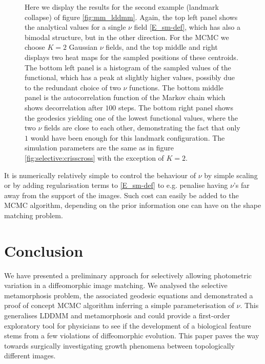 \documentclass[runningheads]{llncs}
\begin{document}
\begin{figure}[h!]
    \caption{ Here we display the results for the second example (landmark
    collapse) of figure \ref{fig:mm_lddmm}.  Again, the top left panel shows the
    analytical values for a single $\nu$ field \eqref{E_sm-def}, which has also
    a bimodal structure, but in the other direction.  For the MCMC we choose
    $K=2$ Gaussian $\nu$ fields, and the top middle and right displays two heat
    maps for the sampled positions of these centroids.  The bottom left panel is
    a histogram of the sampled values of the functional, which has a peak at
    slightly higher values, possibly due to the redundant choice of two $\nu$
    functions.  The bottom middle panel is the autocorrelation function of the
    Markov chain which shows decorrelation after $100$ steps.  The bottom right
    panel shows the geodesics yielding one of the lowest functional values,
    where the two $\nu$  fields are close to each other, demonstrating the fact
    that only $1$ would have been enough for this landmark configuration.  The
    simulation parameters are the same as in figure
    \ref{fig:selective:crisscross} with the exception of $K=2$.
}
    \label{fig:selective:pinch}
\end{figure}

It is numerically relatively simple to control the behaviour of $\nu$ by simple
scaling or by adding regularisation terms to \eqref{E_sm-def} to e.g. penalise
having $\nu$'s far away from the support of the images. 
Such cost can easily be added to the MCMC algorithm, depending on the prior
information one can have on the shape matching problem.

\section{Conclusion}\label{sec:outlook}

We have presented a preliminary approach for selectively allowing photometric
variation in a diffeomorphic image matching. We analysed the selective
metamorphosis problem, the associated geodesic equations and demonstrated a
proof of concept MCMC algorithm inferring a simple parameterisation of $\nu$.
This generalises LDDMM and metamorphosis and could provide a first-order
exploratory tool for physicians to see if the development of a biological
feature stems from a few violations of diffeomorphic evolution. This paper paves
the way towards surgically investigating growth phenomena between topologically
different images.
\end{document}
